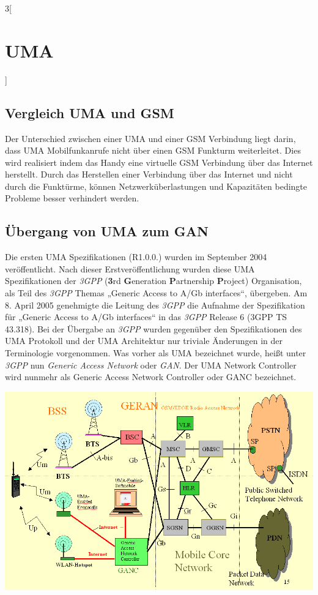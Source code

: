 \begin{multicols}{3}[\section{UMA}]
\subsection*{Vergleich UMA und GSM}
Der Unterschied zwischen einer UMA und einer GSM Verbindung liegt darin, dass UMA Mobilfunkanrufe nicht über einen GSM Funkturm weiterleitet. Dies wird realisiert indem das Handy eine virtuelle GSM Verbindung über das Internet herstellt. Durch das Herstellen einer Verbindung über das Internet und nicht durch die Funktürme, können Netzwerküberlastungen und Kapazitäten bedingte Probleme besser verhindert werden.~\cite{uma.1}

\subsection*{Übergang von UMA zum GAN}
Die ersten UMA Spezifikationen (R1.0.0.) wurden im September 2004 veröffentlicht. Nach dieser Erstveröffentlichung wurden diese UMA Spezifikationen der \textit{3GPP} (\textbf{3}rd \textbf{G}eneration \textbf{P}artnership \textbf{P}roject) Organisation, als Teil des \textit{3GPP} Themas „Generic Access to A/Gb interfaces“, übergeben. 
Am 8. April 2005 genehmigte die Leitung des \textit{3GPP} die Aufnahme der Spezifikation für „Generic Access to A/Gb interfaces“ in das \textit{3GPP} Release 6 (3GPP TS 43.318). 
Bei der Übergabe an \textit{3GPP} wurden gegenüber den Spezifikationen des UMA Protokoll und der UMA Architektur nur triviale Änderungen in der Terminologie vorgenommen.
Was vorher als UMA bezeichnet wurde, heißt unter \textit{3GPP} nun \textit{Generic Access Network} oder \textit{GAN}. Der UMA Network Controller wird nunmehr als Generic Access Network Controller oder GANC bezeichnet.
\begin{Figure}
\includegraphics[width=\linewidth]{Kapitel/UMA/Grafiken/GANC_Rolle.png}

\end{Figure}
\end{multicols}
